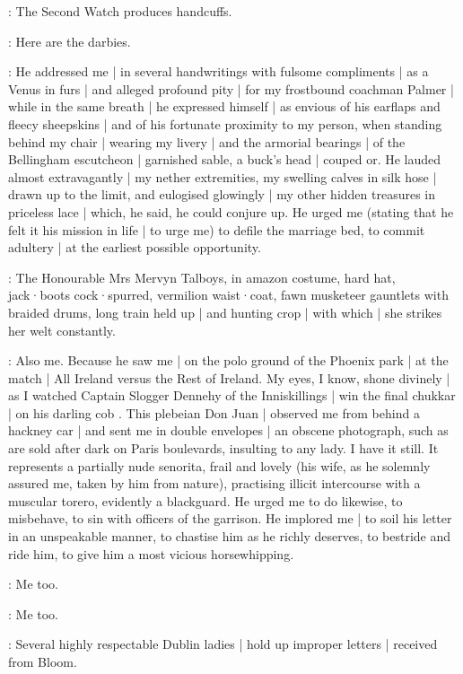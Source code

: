 :
The Second Watch produces handcuffs.

\SecondWatch:
Here are the darbies.

\Bellingham:
He addressed me |
in several handwritings with fulsome compliments |
as a Venus in furs |
and alleged profound pity |
for my frostbound coachman Palmer |
while in the same breath |
he expressed himself |
as envious of his earflaps and fleecy sheepskins |
and of his fortunate proximity to my person,
when standing behind my chair |
wearing my livery |
and the armorial bearings |
of the Bellingham escutcheon |
garnished sable,
a buck's head |
couped or.
He lauded almost extravagantly |
my nether extremities,
my swelling calves in silk hose |
drawn up to the limit,
and eulogised glowingly |
my other hidden treasures in priceless lace |
which,
he said,
he could conjure up.
He urged me
(stating that he felt it his mission in life |
to urge me)
to defile the marriage bed,
to commit adultery |
at the earliest possible opportunity.

:
The Honourable Mrs Mervyn Talboys,
in amazon costume,
hard hat,
jack·boots cock·spurred,
vermilion waist·coat,
fawn musketeer gauntlets with braided drums,
long train held up |
and hunting crop |
with which |
she strikes her welt constantly.

\Talboys:
Also me.
Because he saw me |
on the polo ground of the Phoenix park |
at the match |
All Ireland versus the Rest of Ireland.
My eyes,
I know,
shone divinely |
as I watched Captain Slogger Dennehy of the Inniskillings |
win the final chukkar |
on his darling cob .
This plebeian Don Juan |
observed me from behind a hackney car |
and sent me in double envelopes |
an obscene photograph,
such as are sold after dark on Paris boulevards,
insulting to any lady.
I have it still.
It represents a partially nude senorita,
frail and lovely
(his wife,
as he solemnly assured me,
taken by him from nature),
practising illicit intercourse with a muscular torero,
evidently a blackguard.
He urged me to do likewise,
to misbehave,
to sin with officers of the garrison.
He implored me |
to soil his letter in an unspeakable manner,
to chastise him as he richly deserves,
to bestride and ride him,
to give him a most vicious horsewhipping.

\Bellingham:
Me too.

\Yelverton:
Me too.

:
Several highly respectable Dublin ladies |
hold up improper letters |
received from Bloom.

